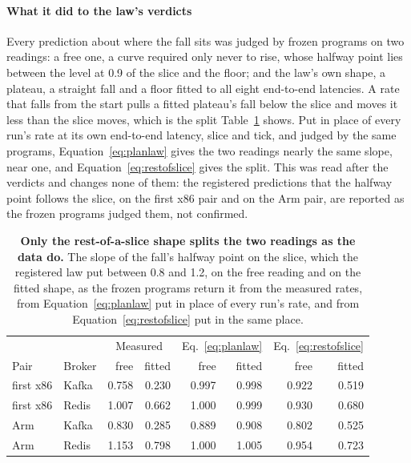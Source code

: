 \documentclass[10pt,journal,onecolumn]{IEEEtran}
\newcommand{\kafka}{Kafka}
\newcommand{\redis}{Redis}
\begin{document}
\paragraph{What it did to the law's verdicts} Every prediction about where the fall sits was
judged by frozen programs on two readings: a free one, a curve required only never to rise, whose
halfway point lies between the level at 0.9 of the slice and the floor; and the law's own shape, a
plateau, a straight fall and a floor fitted to all eight end-to-end latencies. A rate that falls from the
start pulls a fitted plateau's fall below the slice and moves it less than the slice moves, which
is the split Table~\ref{tab:lawshape} shows. Put in place of every run's rate at its own end-to-end
latency, slice and tick, and judged by the same programs, Equation~\ref{eq:planlaw} gives the two readings
nearly the same slope, near one, and Equation~\ref{eq:restofslice} gives the split. This was read
after the verdicts and changes none of them: the registered predictions that the halfway point
follows the slice, on the first x86 pair and on the Arm pair, are reported as the frozen programs
judged them, not confirmed.

\begin{table}[tb]
\caption{\textbf{Only the rest-of-a-slice shape splits the two readings as the data do.} The
slope of the fall's halfway point on the slice, which the registered law put between 0.8 and 1.2,
on the free reading and on the fitted shape, as the frozen programs return it from the measured
rates, from Equation~\ref{eq:planlaw} put in place of every run's rate, and from
Equation~\ref{eq:restofslice} put in the same place.}
\label{tab:lawshape}
\centering
\footnotesize
\begin{tabular}{@{}llrrrrrr@{}}
\toprule
 & & \multicolumn{2}{c}{Measured} & \multicolumn{2}{c}{Eq.~\ref{eq:planlaw}} & \multicolumn{2}{c}{Eq.~\ref{eq:restofslice}}\\
Pair & Broker & free & fitted & free & fitted & free & fitted\\
\midrule
first x86 & \kafka{} & 0.758 & 0.230 & 0.997 & 0.998 & 0.922 & 0.519\\
first x86 & \redis{} & 1.007 & 0.662 & 1.000 & 0.999 & 0.930 & 0.680\\
Arm & \kafka{} & 0.830 & 0.285 & 0.889 & 0.908 & 0.802 & 0.525\\
Arm & \redis{} & 1.153 & 0.798 & 1.000 & 1.005 & 0.954 & 0.723\\
\bottomrule
\end{tabular}
\end{table}
\end{document}
